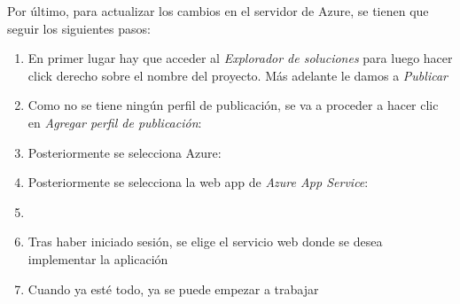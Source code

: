 Por último, para actualizar los cambios en el servidor de Azure, se tienen que seguir los siguientes pasos:
\begin{enumerate}
    \item En primer lugar hay que acceder al \textit{Explorador de soluciones} para luego hacer click derecho sobre el nombre del proyecto. Más adelante le damos a \textit{Publicar} 
    \item Como no se tiene ningún perfil de publicación, se va a proceder a hacer clic en \textit{Agregar perfil de publicación}:
    \item Posteriormente se selecciona Azure: 
    \item Posteriormente se selecciona la web app de \textit{Azure App Service}:
    \item {}
    \item Tras haber iniciado sesión, se elige el servicio web donde se desea implementar la aplicación 
    \item Cuando ya esté todo, ya se puede empezar a trabajar 
\end{enumerate}


